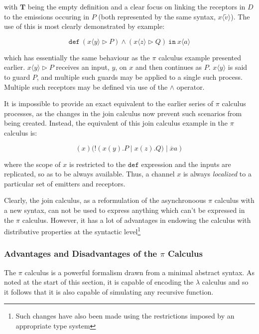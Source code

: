 \noindent with $\mathbf{T}$ being the empty definition and a clear
focus on linking the receptors in $D$ to the emissions occuring in $P$
(both represented by the same syntax, $x\langle \tilde{v} \rangle$).
The use of this is most clearly demonstrated by example:

\begin{equation}
  \mathtt{def}\ (x\langle y \rangle \rhd P) \wedge (x\langle z \rangle \rhd Q)\ \mathtt{in}\ x \langle a \rangle
\end{equation}

\noindent which has essentially the same behaviour as the $\pi$
calculus example presented earlier.  $x\langle y \rangle \rhd P$
receives an input, $y$, on $x$ and then continues as $P$.  $x\langle y
\rangle$ is said to guard $P$, and multiple such guards may be applied
to a single such process.  Multiple such receptors may be defined via
use of the $\wedge$ operator.

It is impossible to provide an exact equivalent to the earlier series
of $\pi$ calculus processes, as the changes in the join calculus now
prevent such scenarios from being created.  Instead, the equivalent of
this join calculus example in the $\pi$ calculus is:

\begin{equation}
(x)(!(x(y).P\;|\;x(z).Q)\;|\;\overline{x}a)
\end{equation}

\noindent where the scope of $x$ is restricted to the $\mathtt{def}$
expression and the inputs are replicated, so as to be always
available.  Thus, a channel $x$ is always \emph{localized} to a
particular set of emitters and receptors.

Clearly, the join calculus, as a reformulation of the asynchronoous
$\pi$ calculus with a new syntax, can not be used to express anything
which can't be expressed in the $\pi$ calculus.  However, it has a lot
of advantages in endowing the calculus with distributive properties at
the syntactic level\footnote{Such changes have also been made using the
restrictions imposed by an appropriate type system}

\subsubsection{Advantages and Disadvantages of the $\pi$ Calculus}

The $\pi$ calculus is a powerful formalism drawn from a minimal
abstract syntax.  As noted at the start of this section, it is capable
of encoding the $\lambda$ calculus and so it follows that it is also
capable of simulating any recursive function.

